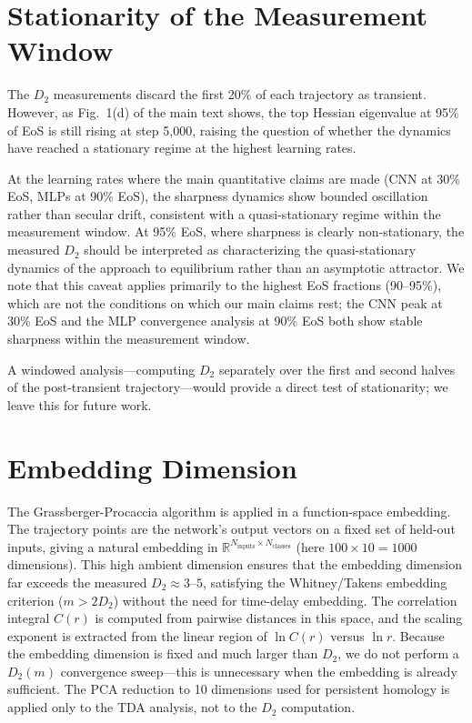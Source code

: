 \documentclass[aps,prl,twocolumn,superscriptaddress]{revtex4-2}
\begin{document}
\section{Stationarity of the Measurement Window}

The $D_2$ measurements discard the first 20\% of each trajectory as transient. However, as Fig.~1(d) of the main text shows, the top Hessian eigenvalue at 95\% of EoS is still rising at step 5{,}000, raising the question of whether the dynamics have reached a stationary regime at the highest learning rates.

At the learning rates where the main quantitative claims are made (CNN at 30\% EoS, MLPs at 90\% EoS), the sharpness dynamics show bounded oscillation rather than secular drift, consistent with a quasi-stationary regime within the measurement window. At 95\% EoS, where sharpness is clearly non-stationary, the measured $D_2$ should be interpreted as characterizing the quasi-stationary dynamics of the approach to equilibrium rather than an asymptotic attractor. We note that this caveat applies primarily to the highest EoS fractions (90--95\%), which are not the conditions on which our main claims rest; the CNN peak at 30\% EoS and the MLP convergence analysis at 90\% EoS both show stable sharpness within the measurement window.

A windowed analysis---computing $D_2$ separately over the first and second halves of the post-transient trajectory---would provide a direct test of stationarity; we leave this for future work.

\section{Embedding Dimension}

The Grassberger-Procaccia algorithm is applied in a function-space embedding. The trajectory points are the network's output vectors on a fixed set of held-out inputs, giving a natural embedding in $\mathbb{R}^{N_\text{inputs} \times N_\text{classes}}$ (here $100 \times 10 = 1000$ dimensions). This high ambient dimension ensures that the embedding dimension far exceeds the measured $D_2 \approx 3$--$5$, satisfying the Whitney/Takens embedding criterion ($m > 2D_2$) without the need for time-delay embedding. The correlation integral $C(r)$ is computed from pairwise distances in this space, and the scaling exponent is extracted from the linear region of $\ln C(r)$ versus $\ln r$. Because the embedding dimension is fixed and much larger than $D_2$, we do not perform a $D_2(m)$ convergence sweep---this is unnecessary when the embedding is already sufficient. The PCA reduction to 10 dimensions used for persistent homology is applied only to the TDA analysis, not to the $D_2$ computation.
\end{document}
